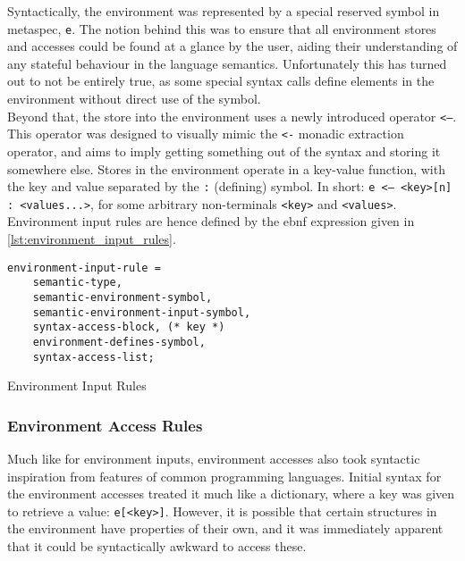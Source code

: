 Syntactically, the environment was represented by a special reserved symbol in \gls{metaspec}, \texttt{e}. 
The notion behind this was to ensure that all environment stores and accesses could be found at a glance by the user, aiding their understanding of any stateful behaviour in the language semantics. 
Unfortunately this has turned out to not be entirely true, as some special syntax calls define elements in the environment without direct use of the symbol.\\

Beyond that, the store into the environment uses a newly introduced operator \texttt{<--}. 
This operator was designed to visually mimic the \texttt{<-} monadic extraction operator, and aims to imply getting something out of the syntax and storing it somewhere else. 
Stores in the environment operate in a key-value function, with the key and value separated by the \texttt{:} (defining) symbol.
In short: \texttt{e <-- <key>[n] : <values...>}, for some arbitrary non-terminals \texttt{<key>} and \texttt{<values>}.
Environment input rules are hence defined by the \gls{ebnf} expression given in \autoref{lst:environment_input_rules}.

\begin{listing}[!htb]
\begin{verbatim}
environment-input-rule =
    semantic-type, 
    semantic-environment-symbol,
    semantic-environment-input-symbol,
    syntax-access-block, (* key *)
    environment-defines-symbol,
    syntax-access-list;
\end{verbatim}
\caption{Environment Input Rules}
\label{lst:environment_input_rules}
\end{listing}


\subsubsection{Environment Access Rules} %
\label{ssub:environment_access_rules}
Much like for environment inputs, environment accesses also took syntactic inspiration from features of common programming languages. 
Initial syntax for the environment accesses treated it much like a dictionary, where a key was given to retrieve a value: \texttt{e[<key>]}.
However, it is possible that certain structures in the environment have properties of their own, and it was immediately apparent that it could be syntactically awkward to access these.\\

